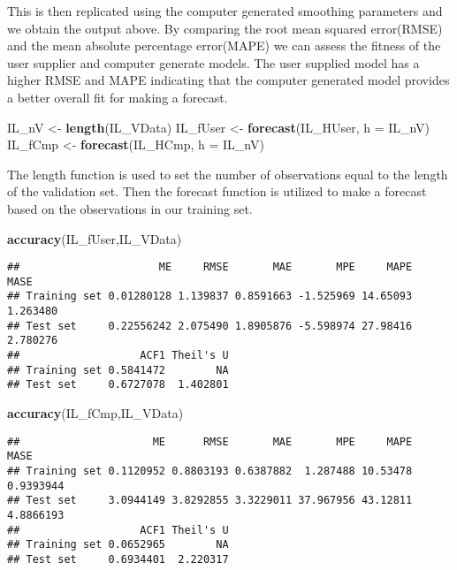 \documentclass[
]{article}
\newenvironment{Shaded}{\begin{snugshade}}{\end{snugshade}}
\newcommand{\DataTypeTok}[1]{\textcolor[rgb]{0.13,0.29,0.53}{#1}}
\newcommand{\KeywordTok}[1]{\textcolor[rgb]{0.13,0.29,0.53}{\textbf{#1}}}
\newcommand{\NormalTok}[1]{#1}
\newcommand{\StringTok}[1]{\textcolor[rgb]{0.31,0.60,0.02}{#1}}
\begin{document}
This is then replicated using the computer generated smoothing
parameters and we obtain the output above. By comparing the root mean
squared error(RMSE) and the mean absolute percentage error(MAPE) we can
assess the fitness of the user supplier and computer generate models.
The user supplied model has a higher RMSE and MAPE indicating that the
computer generated model provides a better overall fit for making a
forecast.

\begin{Shaded}
\begin{Highlighting}[]
\NormalTok{IL_nV <-}\StringTok{ }\KeywordTok{length}\NormalTok{(IL_VData)}
\NormalTok{IL_fUser <-}\StringTok{ }\KeywordTok{forecast}\NormalTok{(IL_HUser, }\DataTypeTok{h =}\NormalTok{ IL_nV)}
\NormalTok{IL_fCmp <-}\StringTok{ }\KeywordTok{forecast}\NormalTok{(IL_HCmp, }\DataTypeTok{h =}\NormalTok{ IL_nV)}
\end{Highlighting}
\end{Shaded}

The length function is used to set the number of observations equal to
the length of the validation set. Then the forecast function is utilized
to make a forecast based on the observations in our training set.

\begin{Shaded}
\begin{Highlighting}[]
\KeywordTok{accuracy}\NormalTok{(IL_fUser,IL_VData)}
\end{Highlighting}
\end{Shaded}

\begin{verbatim}
##                      ME     RMSE       MAE       MPE     MAPE     MASE
## Training set 0.01280128 1.139837 0.8591663 -1.525969 14.65093 1.263480
## Test set     0.22556242 2.075490 1.8905876 -5.598974 27.98416 2.780276
##                   ACF1 Theil's U
## Training set 0.5841472        NA
## Test set     0.6727078  1.402801
\end{verbatim}

\begin{Shaded}
\begin{Highlighting}[]
\KeywordTok{accuracy}\NormalTok{(IL_fCmp,IL_VData)}
\end{Highlighting}
\end{Shaded}

\begin{verbatim}
##                     ME      RMSE       MAE       MPE     MAPE      MASE
## Training set 0.1120952 0.8803193 0.6387882  1.287488 10.53478 0.9393944
## Test set     3.0944149 3.8292855 3.3229011 37.967956 43.12811 4.8866193
##                   ACF1 Theil's U
## Training set 0.0652965        NA
## Test set     0.6934401  2.220317
\end{verbatim}
\end{document}
